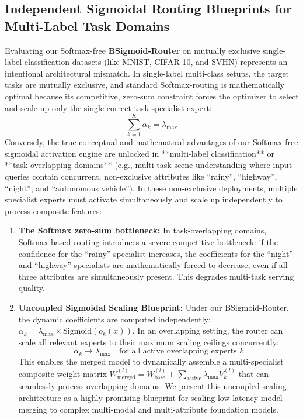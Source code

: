 \subsection{Independent Sigmoidal Routing Blueprints for Multi-Label Task Domains}
\label{sec:multilabel}
Evaluating our Softmax-free \textbf{BSigmoid-Router} on mutually exclusive single-label classification datasets (like MNIST, CIFAR-10, and SVHN) represents an intentional architectural mismatch. In single-label multi-class setups, the target tasks are mutually exclusive, and standard Softmax-routing is mathematically optimal because its competitive, zero-sum constraint forces the optimizer to select and scale up only the single correct task-specialist expert:
\begin{equation}
    \sum_{k=1}^K \bar{\alpha}_k = \lambda_{\text{max}}
\end{equation}
Conversely, the true conceptual and mathematical advantages of our Softmax-free sigmoidal activation engine are unlocked in **multi-label classification** or **task-overlapping domains** (e.g., multi-task scene understanding where input queries contain concurrent, non-exclusive attributes like ``rainy'', ``highway'', ``night'', and ``autonomous vehicle''). In these non-exclusive deployments, multiple specialist experts must activate simultaneously and scale up independently to process composite features:
\begin{enumerate}
    \item \textbf{The Softmax zero-sum bottleneck:} In task-overlapping domains, Softmax-based routing introduces a severe competitive bottleneck: if the confidence for the ``rainy'' specialist increases, the coefficients for the ``night'' and ``highway'' specialists are mathematically forced to decrease, even if all three attributes are simultaneously present. This degrades multi-task serving quality.
    \item \textbf{Uncoupled Sigmoidal Scaling Blueprint:} Under our BSigmoid-Router, the dynamic coefficients are computed independently: $\alpha_{k} = \lambda_{\text{max}} \times \text{Sigmoid}(o_k(x))$. In an overlapping setting, the router can scale all relevant experts to their maximum scaling ceilings concurrently:
    \begin{equation}
        \bar{\alpha}_k \to \lambda_{\text{max}} \quad \text{for all active overlapping experts } k
    \end{equation}
    This enables the merged model to dynamically assemble a multi-specialist composite weight matrix $W_{\text{merged}}^{(l)} = W_{\text{base}}^{(l)} + \sum_{\text{active}} \lambda_{\text{max}} V_k^{(l)}$ that can seamlessly process overlapping domains. We present this uncoupled scaling architecture as a highly promising blueprint for scaling low-latency model merging to complex multi-modal and multi-attribute foundation models.
\end{enumerate}


